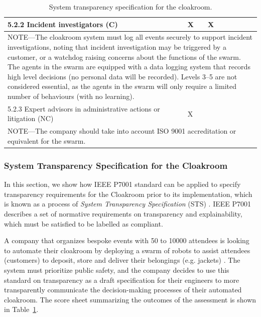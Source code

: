 \documentclass[lettersize,journal]{IEEEtran}
\begin{document}
\begin{table}
\begin{tabular}{|l| l| l| l| l| l|}
		5.2.2 Incident investigators (C) & X & X & & & \\ \hline
		\multicolumn{6}{|p{15cm}|}{NOTE—The cloakroom system must log all events securely to support incident investigations, noting that incident investigation may be triggered by a customer, or a watchdog raising concerns about the functions of the swarm. The agents in the swarm are equipped with a data logging system that records high level decisions (no personal data will be recorded). Levels 3--5 are not considered essential, as the agents in the swarm will only require a limited number of behaviours (with no learning).  }\\ \hline
		5.2.3 Expert advisors in administrative actions or litigation (NC) & X & & & & \\ \hline
		\multicolumn{6}{|p{15cm}|}{NOTE—The company should take into account ISO 9001 accreditation or equivalent for the swarm.}\\ \hline
	\end{tabular}
	\caption{\label{tab:transparency}System transparency specification for the cloakroom.}
\end{table}

\subsubsection{System Transparency Specification for the Cloakroom}
In this section, we show how IEEE P7001 standard can be applied to specify transparency requirements for the Cloakroom prior to its implementation, which is known as a process of \textit{System Transparency Specification} (STS) \cite{IEEE-P7001}. IEEE P7001 describes a set of normative requirements on transparency and explainability, which must be satisfied to be labelled as compliant. %

A company that organizes bespoke events with 50 to 10000 attendees is looking to automate their cloakroom by deploying a swarm of robots to assist attendees (customers) to deposit, store and deliver their belongings (e.g. jackets) \cite{Jones2020}. %
The system must prioritize public safety, and the company decides to use this standard on transparency as a draft specification for their engineers to more transparently communicate the decision-making processes of their automated cloakroom. %
The score sheet summarizing the outcomes of the assessment is shown in Table~\ref{tab:transparency}. \\
\end{document}
